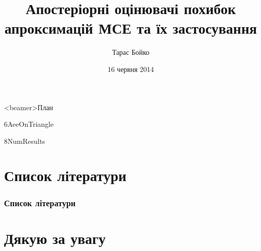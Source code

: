 \documentclass[12pt]{beamer}
\title[Апостеріорні оцінювачі похибок МСЕ]{Апостеріорні оцінювачі похибок апроксимацій МСЕ та їх застосування}
\author{Тарас Бойко}
\date{16 червня 2014}
\begin{document}
	

	\begin{frame}<beamer>{План}
		\setcounter{tocdepth}{1}
		\tableofcontents
	\end{frame}

	
	
	
	
	
	{6AeeOnTriangle}
	
	{8NumResults}

	

	\section*{Список літератури}
	\frame{\sectionpage}
	\begin{frame}[allowframebreaks]
		\frametitle<presentation>{Список літератури}
		\nocite{*}
		\printbibliography
	\end{frame}

	\section*{Дякую за увагу}
	\frame{\sectionpage}
\end{document}
